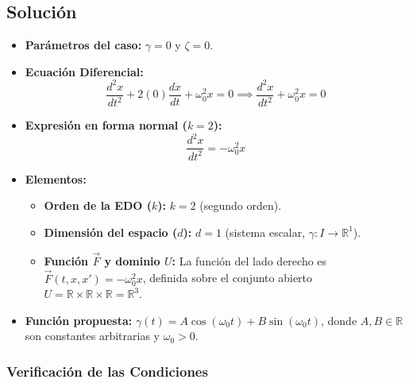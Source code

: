 \begin{enumerate}[label=\arabic*., leftmargin=*]
\begin{enumerate}[label=(\alph*), leftmargin=*]
        \subsection{Solución}
        \begin{itemize}[leftmargin=*]
            \item \textbf{Parámetros del caso:} $\gamma = 0$ y $\zeta = 0$.
            
            \item \textbf{Ecuación Diferencial:}
            \[ \frac{d^2x}{dt^2} + 2(0)\frac{dx}{dt} + \omega_0^2 x = 0 \implies \frac{d^2x}{dt^2} + \omega_0^2 x = 0 \]
            
            \item \textbf{Expresión en forma normal ($k = 2$):}
            \[ \frac{d^2x}{dt^2} = -\omega_0^2 x \]
            
            \item \textbf{Elementos:}
            \begin{itemize}[leftmargin=*]
                \item \textbf{Orden de la EDO ($k$):} $k = 2$ (segundo orden).
                \item \textbf{Dimensión del espacio ($d$):} $d = 1$ (sistema escalar, $\gamma: I \to \mathbb{R}^1$).
                \item \textbf{Función $\vec{F}$ y dominio $U$:} La función del lado derecho es $\vec{F}(t, x, x') = -\omega_0^2 x$, definida sobre el conjunto abierto $U = \mathbb{R} \times \mathbb{R} \times \mathbb{R} = \mathbb{R}^3$.
            \end{itemize}
            
            \item \textbf{Función propuesta:} $\gamma(t) = A \cos(\omega_0 t) + B \sin(\omega_0 t)$, donde $A, B \in \mathbb{R}$ son constantes arbitrarias y $\omega_0 > 0$.
        \end{itemize}

        \subsubsection*{Verificación de las Condiciones }


\end{enumerate}
\end{enumerate}
